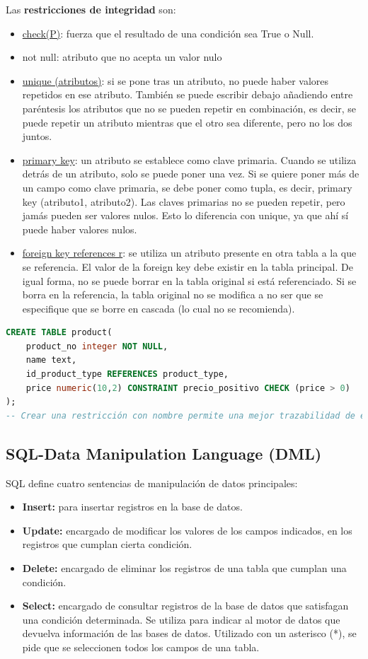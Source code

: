 Las \textbf{restricciones de integridad} son: 
\begin{itemize}
\item \underline{check(P)}: fuerza que el resultado de una condición sea True o Null.
\item not null: atributo que no acepta un valor nulo
\item \underline{unique (atributos)}: si se pone tras un atributo, no puede haber valores repetidos en ese atributo. También se puede escribir debajo añadiendo entre paréntesis los atributos que no se pueden repetir en combinación, es decir, se puede repetir un atributo mientras que el otro sea diferente, pero no los dos juntos. 
\item \underline{primary key}: un atributo se establece como clave primaria. Cuando se utiliza detrás de un atributo, solo se puede poner una vez. Si se quiere poner más de un campo como clave primaria, se debe poner como tupla, es decir, primary key (atributo1, atributo2). Las claves primarias no se pueden repetir, pero jamás pueden ser valores nulos. Esto lo diferencia con unique, ya que ahí sí puede haber valores nulos. 
\item \underline{foreign key references r}: se utiliza un atributo presente en otra tabla a la que se referencia. El valor de la foreign key debe existir en la tabla principal. De igual forma, no se puede borrar en la tabla original si está referenciado. Si se borra en la referencia, la tabla original no se modifica a no ser que se especifique que se borre en cascada (lo cual no se recomienda).
\end{itemize}
\begin{lstlisting}[language=SQL]
CREATE TABLE product(
	product_no integer NOT NULL,
	name text,
	id_product_type REFERENCES product_type,
	price numeric(10,2) CONSTRAINT precio_positivo CHECK (price > 0) 
);
-- Crear una restricción con nombre permite una mejor trazabilidad de errores
\end{lstlisting}

\subsection{SQL-Data Manipulation Language (DML)}
SQL define cuatro sentencias de manipulación de datos principales:
\begin{itemize}
\item \textbf{Insert:} para insertar registros en la base de datos.
\item \textbf{Update:} encargado de modificar los valores de los campos indicados, en los registros que cumplan cierta condición.
\item \textbf{Delete:} encargado de eliminar los registros de una tabla que cumplan una condición.
\item \textbf{Select:} encargado de consultar registros de la base de datos que satisfagan una condición determinada. Se utiliza para indicar al motor de datos que devuelva información de las bases de datos. Utilizado con un asterisco (*), se pide que se seleccionen todos los campos de una tabla.
\end{itemize}

